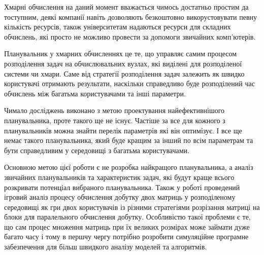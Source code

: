 
Хмарні обчислення на даний момент вважається чимось достатньо простим да тоступним, деякі компанії навіть дозволяють безкоштовно викорустовувати певну кількість ресурсів, також університетам надаються ресурси для складних обчислень, які просто не можливо провести за допомоги звичайних комп'ютерів.

Планувальник у хмарних обчисленнях це те, що управляє самим процесом розподілення задач на обчислювальних вузлах, які виділені для розподіленої системи чи хмари. Саме від стратегії розподілення задач залежить як швидко користувачі отримають результати, наскільки справедливо буде розподілений час обчислень між багатьма користувачами та інші параметри.

Чимало досліджень виконано з метою проектування найефективнішого планувальника, проте такого ще не існує. Частіше за все для кожного з планувальників можна знайти перелік параметрів які він оптимізує. І все ще немає такого планувальника, який буде кращим за інший по всім параметрам та бути справедливим у середовищі з багатьма користувачами.

Основною метою цієї роботи є не розробка найкращого планувальника, а аналіз звичайних планувальників та характеристик задач, які будут краще всього розкривати потенціал вибраного планувальника. Також у роботі проведений ігровий аналіз процесу обчислення добутку двох матриць у розподіленому середовищі як гри двох користувачів із різними стратегіями розрізання матриці на блоки для паралельного обчислення добутку. Особливістю такої проблеми є те, що сам процес множення матриць при їх великих розмірах може займати дуже багато часу і тому в першчу чергу потрібно розробити симуляційне програмне забезпечення для більш швидкого аналізу моделей та алгоритмів.